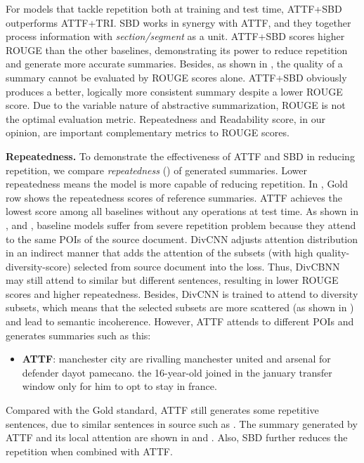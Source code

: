 For models that tackle repetition both at training and test time, 
ATTF+SBD outperforms ATTF+TRI.
SBD works in synergy with ATTF, and they together process 
information with \textit{section/segment} as a unit.
ATTF+SBD scores higher ROUGE than the other baselines, 
demonstrating its power to  reduce 
repetition and generate more accurate summaries.
Besides, as shown in , the quality of a summary cannot be evaluated by
ROUGE scores alone.
ATTF+SBD obviously produces a better, logically more consistent summary despite 
a lower ROUGE score.  
Due to the variable nature of abstractive summarization, ROUGE is
not the optimal evaluation metric.
Repeatedness and Readability score, 
in our opinion, are important complementary metrics to ROUGE scores.  


\textbf{Repeatedness.}
To demonstrate the effectiveness of ATTF and SBD in reducing repetition, 
we compare \textit{repeatedness} () 
of generated summaries.
Lower repeatedness 
means the model is more capable of reducing repetition.
In , Gold row shows the repeatedness scores of
reference summaries. ATTF achieves the lowest
score among all baselines without any operations at test time. 
As shown in ,  and ,
baseline models suffer from severe repetition problem because they attend to the same POIs 
of the source document. DivCNN adjusts attention distribution in an indirect manner that adds the attention of the subsets (with high quality-diversity-score) selected from source document into the loss. Thus, DivCBNN may still attend to similar but different sentences, resulting in lower ROUGE scores and higher repeatedness. 
Besides, DivCNN is trained to attend to diversity subsets, 
which means that the selected subsets are more scattered (as shown in ) and lead to semantic incoherence.
However, ATTF attends to different POIs and generates summaries 
such as this:
\begin{itemize}
	\item[] \textbf{ATTF}: manchester city are rivalling manchester united and arsenal for defender dayot 
	pamecano. the 16-year-old joined in the january transfer window only for 
	him to opt to stay in france.
\end{itemize}

Compared with the Gold standard,
ATTF still generates some repetitive sentences,
due to similar sentences in source
such as .
The summary generated by ATTF and its local attention are
shown in  and .
Also, SBD further reduces the repetition when combined with ATTF. 


